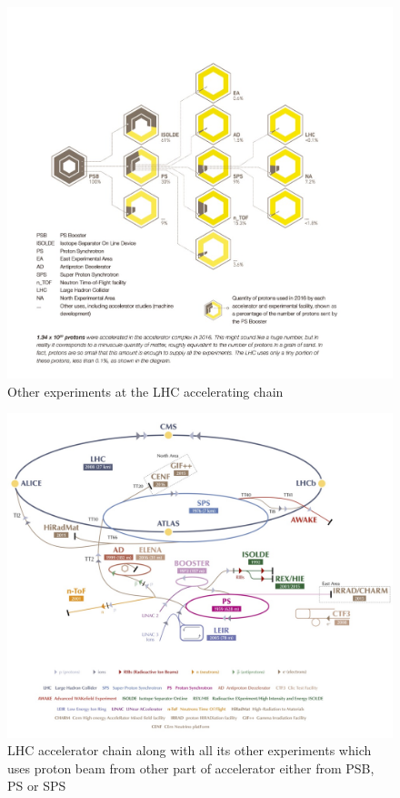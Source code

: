 \begin{figure}[!htbp]
	\centering
	\includegraphics[width=1.0\textwidth]{figures/LHC/distribution_of_protons_en.jpg}
	\caption{Other experiments at the LHC accelerating chain \cite{OtherExpAtLHCAcceleratingChain}}
	\label{fig:OtherExpAtAccStructure}
\end{figure}
\begin{figure}[!htbp]
	\centering
	\includegraphics[width=1.35\textwidth]{figures/LHC/CERN_Accelerator_Complex-v2016.jpg}
	\caption{LHC accelerator chain along with all its other experiments which uses proton beam from other part of accelerator either from PSB, PS or SPS\cite{Fig-CERN-accelerator-complex}}
	\label{fig:CERN-accelerator-complex}
\end{figure}
